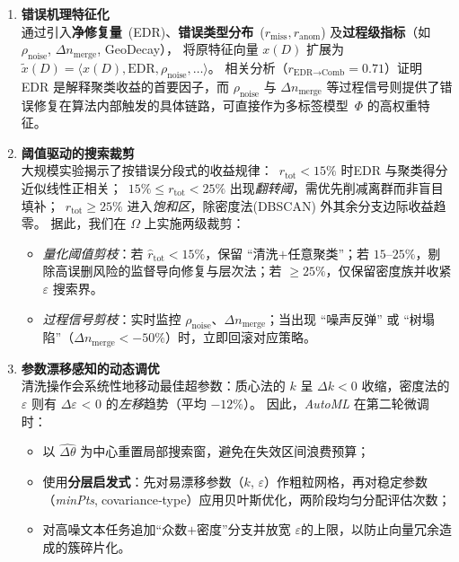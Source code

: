 \documentclass[10pt]{article} %
\numberwithin{equation}{section}
\begin{document}
\begin{enumerate}[leftmargin=1.6em,itemsep=4pt]
  \item \textbf{错误机理特征化}  \\
        通过引入\textbf{净修复量}~(EDR)、\textbf{错误类型分布}~($r_{\mathrm{miss}}, r_{\mathrm{anom}}$) 及\textbf{过程级指标}（如~$\rho_{\text{noise}}$, $\Delta n_{\text{merge}}$, GeoDecay），
        将原特征向量 $x(D)$ 扩展为 $\tilde{x}(D)=\langle x(D),\text{EDR},\rho_{\text{noise}},\dots\rangle$。
        相关分析（$r_{ \text{EDR}\rightarrow\text{Comb}}=0.71$）证明 EDR 是解释聚类收益的首要因子，而 $\rho_{\text{noise}}$ 与 $\Delta n_{\text{merge}}$ 等过程信号则提供了错误修复在算法内部触发的具体链路，可直接作为多标签模型~$\Phi$ 的高权重特征。

  \item \textbf{阈值驱动的搜索裁剪}  \\
        大规模实验揭示了按错误分段式的收益规律：~$r_{\mathrm{tot}}\!<\!15\%$ 时\;EDR 与聚类得分近似线性正相关；~$15\%\!\le r_{\mathrm{tot}}\!<\!25\%$ 出现\emph{翻转阈}，需优先削减离群而非盲目填补；~$r_{\mathrm{tot}}\!\ge\!25\%$ 进入\emph{饱和区}，除密度法(DBSCAN) 外其余分支边际收益趋零。  
        据此，我们在 $\Omega$ 上实施两级裁剪：
        \begin{itemize}
          \item \emph{量化阈值剪枝}：若 $\hat{r}_{\mathrm{tot}}\!<\!15\%$，保留 ``清洗$+$任意聚类''；若 $15$--$25\%$，剔除高误删风险的监督导向修复与层次法；若 $\ge\!25\%$，仅保留密度族并收紧 \(\varepsilon\) 搜索界。
          \item \emph{过程信号剪枝}：实时监控 $\rho_{\text{noise}}$、$\Delta n_{\text{merge}}$；当出现 ``噪声反弹'' 或 ``树塌陷''（$\Delta n_{\text{merge}}<-50\%$）时，立即回滚对应策略。
        \end{itemize}

  \item \textbf{参数漂移感知的动态调优}  \\
        清洗操作会系统性地移动最佳超参数：质心法的 $k$ 呈 $\Delta k<0$ 收缩，密度法的 \(\varepsilon\) 则有 \(\Delta\varepsilon\) < 0 的\emph{左移}趋势（平均 $-12\%$）。  
        因此，\textit{AutoML} 在第二轮微调时：
        \begin{itemize}[leftmargin=1.6em,itemsep=4pt]
          \item 以 $\widehat{\Delta \theta}$ 为中心重置局部搜索窗，避免在失效区间浪费预算；
          \item 使用\textbf{分层启发式}：先对易漂移参数（$k$, \(\varepsilon\)）作粗粒网格，再对稳定参数（\textit{minPts},$\;$covariance‐type）应用贝叶斯优化，两阶段均匀分配评估次数；
          \item 对高噪文本任务追加“众数$+$密度”分支并放宽 \(\varepsilon\)的上限，以防止向量冗余造成的簇碎片化。
        \end{itemize}

\end{enumerate}
\end{document}
